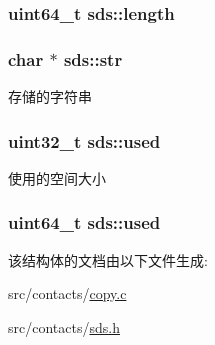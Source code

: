 \subsubsection[{\texorpdfstring{length}{length}}]{\setlength{\rightskip}{0pt plus 5cm}uint64\+\_\+t sds\+::length}\hypertarget{structsds_adb90ca6e399d580a55ab9b5471386970}{}\label{structsds_adb90ca6e399d580a55ab9b5471386970}
\subsubsection[{\texorpdfstring{str}{str}}]{\setlength{\rightskip}{0pt plus 5cm}char $\ast$ sds\+::str}\hypertarget{structsds_a3c48d440195e1e20c013334cd8dc3884}{}\label{structsds_a3c48d440195e1e20c013334cd8dc3884}
存储的字符串 
\subsubsection[{\texorpdfstring{used}{used}}]{\setlength{\rightskip}{0pt plus 5cm}uint32\+\_\+t sds\+::used}\hypertarget{structsds_a5d733da962855ed70322d900c51eb65f}{}\label{structsds_a5d733da962855ed70322d900c51eb65f}
使用的空间大小 
\subsubsection[{\texorpdfstring{used}{used}}]{\setlength{\rightskip}{0pt plus 5cm}uint64\+\_\+t sds\+::used}\hypertarget{structsds_af40aa3f62e6436d417ce199d6288664e}{}\label{structsds_af40aa3f62e6436d417ce199d6288664e}


该结构体的文档由以下文件生成\+:\begin{DoxyCompactItemize}
\item 
src/contacts/\hyperlink{copy_8c}{copy.\+c}\item 
src/contacts/\hyperlink{sds_8h}{sds.\+h}\end{DoxyCompactItemize}
